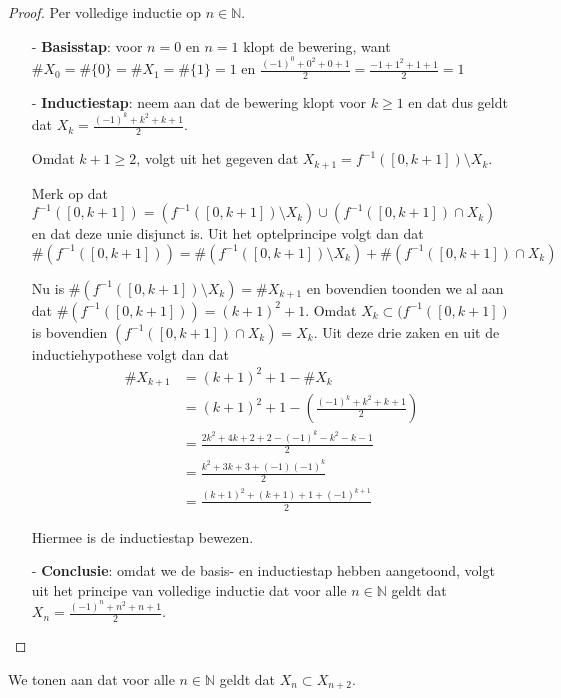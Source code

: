 \documentclass[kulak]{kulakarticle} %
\begin{document}
	\begin{proof}
		Per volledige inductie op \(n \in \mathbb{N}\).

		\begin{itemize}
			\item[-] \textbf{Basisstap}: voor \(n=0\) en \(n=1\) klopt de bewering, want \( \# X_0 = \#\{ 0 \} = \# X_1 = \#\{ 1 \} = 1 \) en \(\frac{(-1)^0+0^2+0+1}{2}=\frac{-1+1^2+1+1}{2}=1\)
			\item[-] \textbf{Inductiestap}: neem aan dat de bewering klopt voor \(k\geq1\) en dat dus geldt dat \(X_k=\frac{(-1)^k+k^2+k+1}{2}\).

			Omdat \(k+1 \geq 2\), volgt uit het gegeven dat \(X_{k+1}=f^{-1}([0,k+1])\setminus X_{k}\).

			Merk op dat \(f^{-1}([0,k+1])=(f^{-1}([0,k+1])\setminus X_{k}) \cup (f^{-1}([0,k+1])\cap X_{k})\) en dat deze unie disjunct is. Uit het optelprincipe volgt dan dat \[\#(f^{-1}([0,k+1]))=\#(f^{-1}([0,k+1])\setminus X_{k}) + \# (f^{-1}([0,k+1])\cap X_{k})\]

			Nu is \(\#(f^{-1}([0,k+1])\setminus X_{k}) = \# X_{k+1}\) en bovendien toonden we al aan dat \( \# (f^{-1}([0,k+1])) = (k+1)^2+1 \). Omdat \(X_{k} \subset (f^{-1}([0,k+1])\) is bovendien \((f^{-1}([0,k+1])\cap X_{k})=X_{k}\). Uit deze drie zaken en uit de inductiehypothese volgt dan dat
			\begin{align*}
				\# X_{k+1} &= (k+1)^2+1 - \#X_{k}\\
									&= (k+1)^2+1 - \left(  \frac{(-1)^k+k^2+k+1}{2} \right)\\
									&= \frac{ 2k^2+4k+2+2-(-1)^k-k^2-k-1 }{2}\\
									&= \frac{ k^2+3k+3+(-1)(-1)^k }{2}\\
									&= \frac{ (k+1)^2+(k+1)+1+(-1)^{k+1} }{2}
			\end{align*}

			Hiermee is de inductiestap bewezen.

			\item[-] \textbf{Conclusie}: omdat we de basis- en inductiestap hebben aangetoond, volgt uit het principe van volledige inductie dat voor alle \(n\in \mathbb{N}\) geldt dat \(X_n=\frac{(-1)^n+n^2+n+1}{2}\).
		\end{itemize}
	\end{proof}

	\newpage

	We tonen aan dat voor alle \(n\in \mathbb{N}\) geldt dat \(X_n \subset X_{n+2}\).
\end{document}

